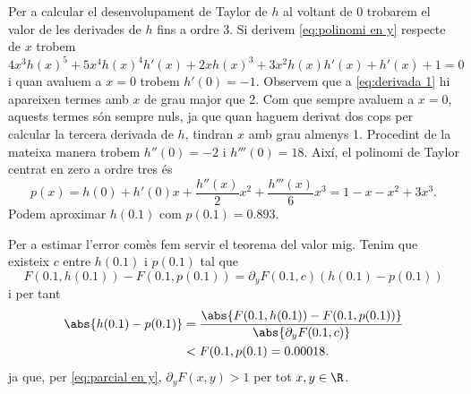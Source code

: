 Per a calcular el desenvolupament de Taylor de \( h \) al voltant de \( 0 \) trobarem el valor de les derivades de \( h \) fins a ordre 3. Si derivem \ref{eq:polinomi en y} respecte de \( x \) trobem
\vspace*{-0.5cm}
\begin{equation}
	4x^3 h(x)^5 + 5x^4 h(x)^4 h'(x) + 2xh(x)^3 + 3x^2 h(x) h'(x) + h'(x) + 1 = 0 \label{eq:derivada 1}
\end{equation}
i quan avaluem a \( x = 0 \) trobem \( h'(0) = -1 \). Observem que a \ref{eq:derivada 1} hi apareixen termes amb \( x \) de grau major que 2. Com que sempre avaluem a \( x = 0 \), aquests termes són sempre nuls, ja que quan haguem derivat dos cops per calcular la tercera derivada de \( h \), tindran \( x \) amb grau almenys 1. Procedint de la mateixa manera trobem \( h''(0) = -2 \) i \( h'''(0) = 18 \). Així, el polinomi de Taylor centrat en zero a ordre tres és 
\begin{equation}
	p(x) = h(0) + h'(0)x + \dfrac{h''(x)}{2}x^2 + \dfrac{h'''(x)}{6}x^3 = 1 - x - x^2 + 3x^3.
\end{equation}
Podem aproximar \( h(0.1) \) com \( p(0.1) = 0.893. \)

Per a estimar l'error comès fem servir el teorema del valor mig. Tenim que existeix \( c \) entre \( h(0.1) \) i \( p(0.1) \) tal que 
\begin{equation}
	F(0.1, h(0.1)) - F(0.1, p(0.1)) = \partial_y F(0.1, c) (h(0.1) - p(0.1))
\end{equation}
i per tant
\begin{align*}
	\abs{h(0.1) - p(0.1)} &= \dfrac{\abs{F(0.1, h(0.1)) - F(0.1, p(0.1))}}{\abs{\partial_y F(0.1,c)}} \\
												&< F(0.1, p(0.1) = 0.00018.
\end{align*}
ja que, per \ref{eq:parcial en y}, \( \partial_y F(x,y) > 1 \) per tot \( x,y \in \R \).
